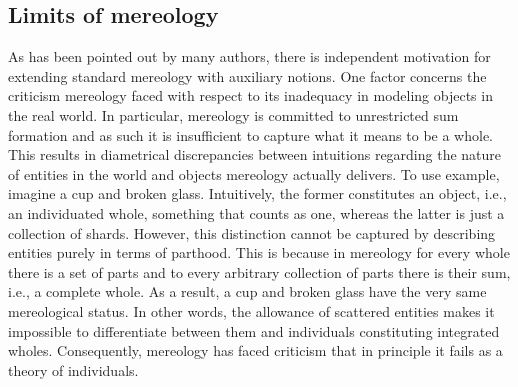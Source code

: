 \subsection{Limits of mereology}\label{sec:limits-of-mereology}

As has been pointed out by many authors, there is independent motivation for extending standard mereology with auxiliary notions. One factor concerns the criticism mereology faced with respect to its inadequacy in modeling objects in the real world. In particular, mereology is committed to unrestricted sum formation and as such it is insufficient to capture what it means to be a whole. This results in diametrical discrepancies between intuitions regarding the nature of entities in the world and objects mereology actually delivers. To use  example, imagine a cup and broken glass. Intuitively, the former constitutes an object, i.e., an individuated whole, something that counts as one, whereas the latter is just a collection of shards. However, this distinction cannot be captured by describing entities purely in terms of parthood. This is because in mereology for every whole there is a set of parts and to every arbitrary collection of parts there is their sum, i.e., a complete whole. As a result, a cup and broken glass have the very same mereological status. In other words, the allowance of scattered entities makes it impossible to differentiate between them and individuals constituting integrated wholes. Consequently, mereology has faced criticism that in principle it fails as a theory of individuals.

